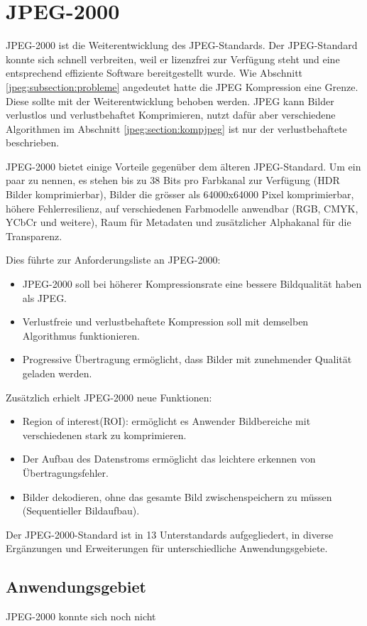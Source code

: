%
%
%
%
\section{JPEG-2000 
\label{jpeg:section:jpeg2000}}
JPEG-2000 ist die Weiterentwicklung des JPEG-Standards.
Der JPEG-Standard konnte sich schnell verbreiten, weil er lizenzfrei zur Verfügung steht und eine entsprechend effiziente Software bereitgestellt wurde.
Wie Abschnitt \ref{jpeg:subsection:probleme} angedeutet hatte die JPEG Kompression eine Grenze.
Diese sollte mit der Weiterentwicklung behoben werden. 
JPEG kann Bilder verlustlos und verlustbehaftet Komprimieren, nutzt dafür aber verschiedene Algorithmen im Abschnitt \ref{jpeg:section:kompjpeg} ist nur der verlustbehaftete beschrieben.

JPEG-2000 bietet einige Vorteile gegenüber dem älteren JPEG-Standard.
Um ein paar zu nennen, es stehen bis zu 38 Bits pro Farbkanal zur Verfügung (HDR Bilder komprimierbar), Bilder die grösser als 64000x64000 Pixel komprimierbar, höhere Fehlerresilienz, auf verschiedenen Farbmodelle anwendbar (RGB, CMYK, YCbCr und weitere), Raum für Metadaten und zusätzlicher Alphakanal für die Transparenz.


Dies führte zur Anforderungsliste an JPEG-2000:
\begin{itemize}
    \item JPEG-2000 soll bei höherer Kompressionsrate eine bessere Bildqualität haben als JPEG.
    \item Verlustfreie und verlustbehaftete Kompression soll mit demselben Algorithmus funktionieren.
    \item Progressive Übertragung ermöglicht, dass Bilder mit zunehmender Qualität geladen werden.
\end{itemize}
Zusätzlich erhielt JPEG-2000 neue Funktionen:
\begin{itemize}
    \item Region of interest(ROI): ermöglicht es Anwender Bildbereiche mit verschiedenen stark zu komprimieren.
    \item Der Aufbau des Datenstroms ermöglicht das leichtere erkennen von Übertragungsfehler.
    \item Bilder dekodieren, ohne das gesamte Bild zwischenspeichern zu müssen (Sequentieller Bildaufbau).
\end{itemize}
Der JPEG-2000-Standard ist in 13 Unterstandards aufgegliedert, in diverse Ergänzungen und Erweiterungen für unterschiedliche Anwendungsgebiete. 

\subsection{Anwendungsgebiet
\label{jpeg:subsection:anwendungsgebiet}}
JPEG-2000 konnte sich noch nicht 